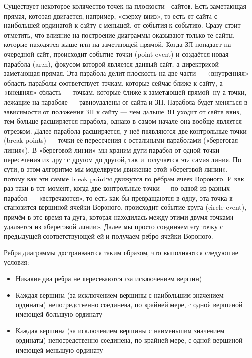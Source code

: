 \documentclass[ a4paper]{article}
\begin{document}
Существует некоторое количество точек на плоскости - сайтов. Есть заметающая прямая, которая двигается, например,  «сверху вниз», то есть от сайта с наибольшей ординатой к сайту с меньшей, от события к событию. Сразу стоит отметить, что влияние на построение диаграммы оказывают только те сайты, которые находятся выше или на заметающей прямой.
Когда ЗП попадает на очередной сайт, происходит событие точки (point event) и создаётся новая парабола (arch), фокусом которой является данный сайт, а директрисой — заметающая прямая. Эта парабола делит плоскость на две части — «внутренняя» область параболы соответствует точкам, которые сейчас ближе к сайту, а «внешняя» область — точкам, которые ближе к заметающей прямой, ну а точки, лежащие на параболе — равноудалены от сайта и ЗП. Парабола будет меняться в зависимости от положения ЗП к сайту — чем дальше ЗП уходит от сайта вниз, тем больше расширяется парабола, однако в самом начале она вообще является отрезком. Далее парабола расширяется, у неё появляются две контрольные точки (break points) — точки её пересечения с остальными параболами («береговая линия»). В «береговой линии» мы храним дуги парабол от одной точки пересечения их друг с другом до другой, так и получается эта самая линия.
По сути, в этом алгоритме мы моделируем движение этой «береговой линии». потому как эти самые break point`ы движутся по рёбрам ячеек Вороного.
И как раз-таки в тот момент, когда две контрольные точки — по одной из разных парабол — «встречаются», то есть как бы превращаются в одну, эта точка и становится вершиной ячейки Вороного, происходит событие круга (circle event), причём в это время та дуга, которая находилась между этими двумя точками —  удаляется из «береговой линии». Далее мы просто соединяем эту точку с предыдущей соответствующей ей и получаем ребро ячейки Вороного.

Ребра диаграммы достраиваются таким образом, что выполняются следующие условия:
\begin{itemize}
\item Никакие два ребра не пересекаются (за исключением вершин)
\item Каждая вершина (за исключением вершины с наибольшим значением ординаты) непосредственно соединена, по крайней мере, с одной вершиной имеющей большую ординату
\item Каждая вершина (за исключением вершины с наименьшим значением ординаты) непосредственно соединена, по крайней мере, с одной вершиной имеющей меньшую ординату
\end{itemize}
\end{document}
